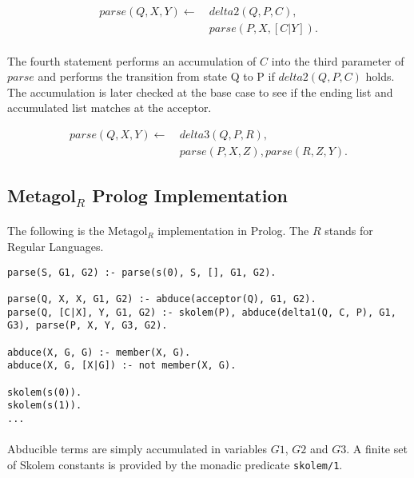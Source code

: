 \documentclass{article}
\theoremstyle{plain}
\theoremstyle{definition}
\begin{document}
\begin{multicols}{2}
\begin{align*}
parse(Q, X, Y) \leftarrow\ &delta2(Q, P, C),\\ &parse(P, X, [C|Y]).
\end{align*}

\paragraph{} The fourth statement performs an accumulation of $C$ into the third parameter of $parse$ and performs the transition from state Q to P if $delta2(Q, P, C)$ holds. The accumulation is later checked at the base case to see if the ending list and accumulated list matches at the acceptor.

\begin{align*}
parse(Q, X, Y) \leftarrow\ &delta3(Q, P, R),\\ &parse(P, X, Z), parse(R, Z, Y).
\end{align*}


\subsection{Metagol${}_R$ Prolog Implementation}

\paragraph{} The following is the Metagol${}_R$ implementation in Prolog. The $R$ stands for Regular Languages.

\begin{lstlisting}
parse(S, G1, G2) :- parse(s(0), S, [], G1, G2).

parse(Q, X, X, G1, G2) :- abduce(acceptor(Q), G1, G2).
parse(Q, [C|X], Y, G1, G2) :- skolem(P), abduce(delta1(Q, C, P), G1, G3), parse(P, X, Y, G3, G2).

abduce(X, G, G) :- member(X, G).
abduce(X, G, [X|G]) :- not member(X, G).

skolem(s(0)).
skolem(s(1)).
...
\end{lstlisting}

\paragraph{} Abducible terms are simply accumulated in variables $G1$, $G2$ and $G3$. A finite set of Skolem constants is provided by the monadic predicate \lstinline{skolem/1}.


\end{multicols}
\end{document}
